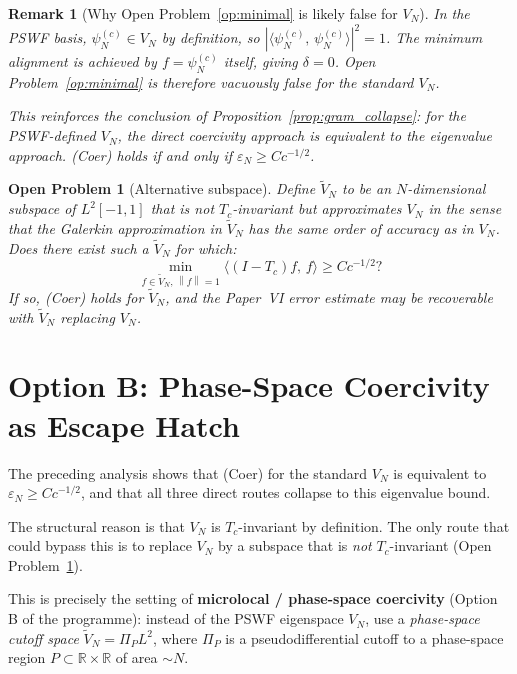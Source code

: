 \documentclass[12pt,a4paper]{article}
\newtheorem{remark}[theorem]{Remark}
\newtheorem{openproblem}[theorem]{Open Problem}
\newcommand{\pswf}[1]{\psi_{#1}^{(c)}}
\newcommand{\Tc}{T_c}
\newcommand{\VN}{V_N}
\newcommand{\inner}[2]{\langle #1,\, #2 \rangle}
\newcommand{\norm}[1]{\left\|#1\right\|}
\begin{document}
\begin{remark}[Why Open Problem~\ref{op:minimal} is likely false for $\VN$]
In the PSWF basis, $\pswf{N} \in \VN$ by definition,
so $|\inner{\pswf{N}}{\pswf{N}}|^2 = 1$.
The minimum alignment is achieved by $f = \pswf{N}$
itself, giving $\delta = 0$.
Open Problem~\ref{op:minimal} is therefore
\emph{vacuously false} for the standard $\VN$.

\medskip\noindent
This reinforces the conclusion of
Proposition~\ref{prop:gram_collapse}:
for the PSWF-defined $\VN$, the direct
coercivity approach is equivalent to the
eigenvalue approach.
(Coer) holds if and only if $\varepsilon_N \geq Cc^{-1/2}$.
\end{remark}

\begin{openproblem}[Alternative subspace]
\label{op:altspace}
Define $\widetilde{V}_N$ to be an $N$-dimensional
subspace of $L^2[-1,1]$ that is \emph{not}
$\Tc$-invariant but approximates $\VN$ in the
sense that the Galerkin approximation in
$\widetilde{V}_N$ has the same order of accuracy
as in $\VN$.
Does there exist such a $\widetilde{V}_N$ for which:
\[
  \min_{f \in \widetilde{V}_N,\, \norm{f}=1}
  \inner{(I-\Tc)f}{f}
  \geq C c^{-1/2}?
\]
If so, (Coer) holds for $\widetilde{V}_N$,
and the Paper~VI error estimate may be recoverable
with $\widetilde{V}_N$ replacing $\VN$.
\end{openproblem}

\section{Option B: Phase-Space Coercivity as Escape Hatch}
\label{sec:optionB}

The preceding analysis shows that (Coer)
for the standard $\VN$ is equivalent to
$\varepsilon_N \geq Cc^{-1/2}$,
and that all three direct routes collapse
to this eigenvalue bound.

\medskip\noindent
The structural reason is that $\VN$ is
$\Tc$-invariant by definition.
The only route that could bypass this is to
replace $\VN$ by a subspace that is
\emph{not} $\Tc$-invariant
(Open Problem~\ref{op:altspace}).

\medskip\noindent
This is precisely the setting of
\textbf{microlocal / phase-space coercivity}
(Option B of the programme):
instead of the PSWF eigenspace $\VN$,
use a \emph{phase-space cutoff space}
$\widetilde{V}_N = \Pi_{P} L^2$,
where $\Pi_P$ is a pseudodifferential
cutoff to a phase-space region $P \subset
\mathbb{R} \times \mathbb{R}$ of area $\sim N$.
\end{document}

